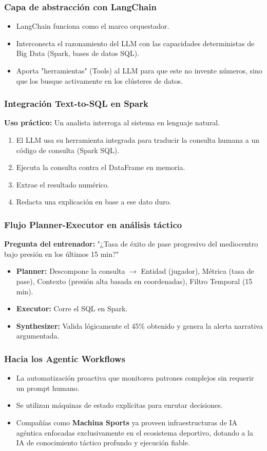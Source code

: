 \documentclass[aspectratio=169]{beamer}
\begin{document}
\begin{frame}\frametitle{Capa de abstracción con LangChain}
\begin{itemize}
    \item LangChain funciona como el marco orquestador.
    \item Interconecta el razonamiento del LLM con las capacidades deterministas de Big Data (Spark, bases de datos SQL).
    \item Aporta "herramientas" (Tools) al LLM para que este no invente números, sino que los busque activamente en los clústeres de datos.
\end{itemize}
\end{frame}

\begin{frame}\frametitle{Integración Text-to-SQL en Spark}
\textbf{Uso práctico:} Un analista interroga al sistema en lenguaje natural.
\begin{enumerate}
    \item El LLM usa su herramienta integrada para traducir la consulta humana a un código de consulta (Spark SQL).
    \item Ejecuta la consulta contra el DataFrame en memoria.
    \item Extrae el resultado numérico.
    \item Redacta una explicación en base a ese dato duro.
\end{enumerate}
\end{frame}

\begin{frame}\frametitle{Flujo Planner-Executor en análisis táctico}
\textbf{Pregunta del entrenador:} "¿Tasa de éxito de pase progresivo del mediocentro bajo presión en los últimos 15 min?"
\begin{itemize}
    \item \textbf{Planner:} Descompone la consulta $\rightarrow$ Entidad (jugador), Métrica (tasa de pase), Contexto (presión alta basada en coordenadas), Filtro Temporal (15 min).
    \item \textbf{Executor:} Corre el SQL en Spark.
    \item \textbf{Synthesizer:} Valida lógicamente el 45\% obtenido y genera la alerta narrativa argumentada.
\end{itemize}
\end{frame}

\begin{frame}\frametitle{Hacia los Agentic Workflows}
\begin{itemize}
    \item La automatización proactiva que monitorea patrones complejos sin requerir un prompt humano.
    \item Se utilizan máquinas de estado explícitas para enrutar decisiones.
    \item Compañías como \textbf{Machina Sports} ya proveen infraestructuras de IA agéntica enfocadas exclusivamente en el ecosistema deportivo, dotando a la IA de conocimiento táctico profundo y ejecución fiable.
\end{itemize}
\end{frame}
\end{document}
